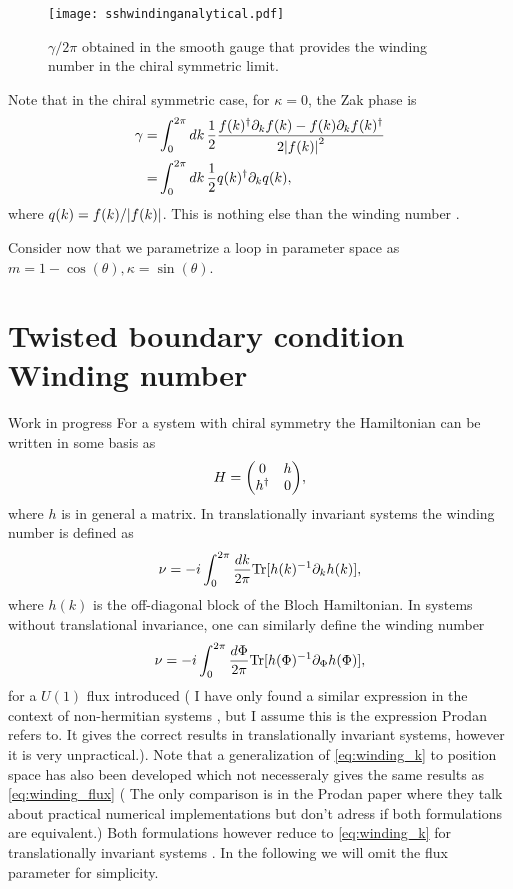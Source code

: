\documentclass[twocolumn,amsmath,longbibliography,amssymb,superscriptaddress]{revtex4-1}
\newcommand{\carlos}[1]{{\color{red} #1}}
\begin{document}
\begin{figure}[t]
	\centering
	\texttt{[image: sshwindinganalytical.pdf]}
	\caption{$\gamma/2\pi$ obtained in the smooth gauge that provides the winding number in the chiral symmetric limit.}
	\label{fig:ssh_zak}
\end{figure}

Note that in the chiral symmetric case, for $\kappa = 0$, the Zak phase is
\begin{align*}
\gamma =& \int_0^{2\pi} dk\,\frac{1}{2}\frac{f(k)^\dagger \partial_k f(k)-f(k)\partial_k f(k)^\dagger}{2\abs{f(k)}^2} \\
=& \int_0^{2\pi} dk\,\frac{1}{2}q(k)^\dagger \partial_k q(k),
\end{align*}
where $q(k) = f(k)/\abs{f(k)}$. This is nothing else than the winding number \cite{ryu2010topological}. 

Consider now that we parametrize a loop in parameter space as $m=1-\cos(\theta),\kappa = \sin(\theta)$.


\section{Twisted boundary condition Winding number}
\carlos{Work in progress}
For a system with chiral symmetry the Hamiltonian can be written in some basis as
\begin{equation}
H = \mqty(0 & h \\ h^\dagger & 0),
\end{equation}
where $h$ is in general a matrix. In translationally invariant systems the winding number is defined as 
\begin{equation}
\nu = -i\int_0^{2\pi} \frac{dk}{2\pi} {\rm Tr}[h(k)^{-1} \partial_k h(k)],
\label{eq:winding_k}
\end{equation}
where $h(k)$ is the off-diagonal block of the Bloch Hamiltonian. In systems without translational invariance, one can similarly define the winding number
\begin{equation}
\nu = -i\int_0^{2\pi} \frac{d\Phi}{2\pi} {\rm Tr}[h(\Phi)^{-1} \partial_\Phi h(\Phi)],
\label{eq:winding_flux}
\end{equation}
for a $U(1)$ flux introduced (\carlos{I have only found a similar expression in the context of non-hermitian systems \cite{Gong2018}, but I assume this is the expression Prodan refers to. It gives the correct results in translationally invariant systems, however it is very unpractical.}). Note that a generalization of \eqref{eq:winding_k} to position space has also been developed which not necesseraly gives the same results as \eqref{eq:winding_flux} (\carlos{The only comparison is in the Prodan paper where they talk about practical numerical implementations but don't adress if both formulations are equivalent.}) Both formulations however reduce to \eqref{eq:winding_k} for translationally invariant systems \cite{Gong2018}.  In the following we will omit the flux parameter for simplicity.
\end{document}
